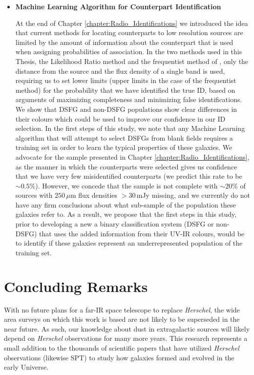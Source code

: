 \begin{itemize}
\item \textbf{Machine Learning Algorithm for Counterpart Identification}

At the end of Chapter \ref{chapter:Radio_Identifications} we introduced the idea that current methods for locating counterparts to low resolution sources are limited by the amount of information about the counterpart that is used when assigning probabilities of association. In the two methods used in this Thesis, the Likelihood Ratio method and the frequentist method of \citealt{Lilly_1999}, only the distance from the source and the flux density of a single band is used, requiring us to set lower limits (upper limits in the case of the frequentist method) for the probability that we have identified the true ID, based on arguments of maximizing completeness and minimizing false identifications. We show that DSFG and non-DSFG populations show clear differences in their colours which could be used to improve our confidence in our ID selection. In the first steps of this study, we note that any Machine Learning algorithm that will attempt to select DSFGs from blank fields requires a training set in order to learn the typical properties of these galaxies. We advocate for the sample presented in Chapter \ref{chapter:Radio_Identifications}, as the manner in which the counterparts were selected gives us confidence that we have very few misidentified counterparts (we predict this rate to be $\sim0.5\%$). However, we concede that the sample is not complete with $\sim20\%$ of sources with $250\,\mu$m flux densities $>30\,$mJy missing, and we currently do not have any firm conclusions about what sub-sample of the population these galaxies refer to. As a result, we propose that the first steps in this study, prior to developing a new a binary classification system (DSFG or non-DSFG) that uses the added information from their UV-IR colours, would be to identify if these galaxies represent an underrepresented population of the training set. 

\end{itemize}

\section{Concluding Remarks}

With no future plans for a far-IR space telescope to replace \textit{Herschel}, the wide area surveys on which this work is based are not likely to be superseded in the near future. As such, our knowledge about dust in extragalactic sources will likely depend on \textit{Herschel} observations for many more years. This research represents a small addition to the thousands of scientific papers that have utilized \textit{Herschel} observations (likewise SPT) to study how galaxies formed and evolved in the early Universe.
